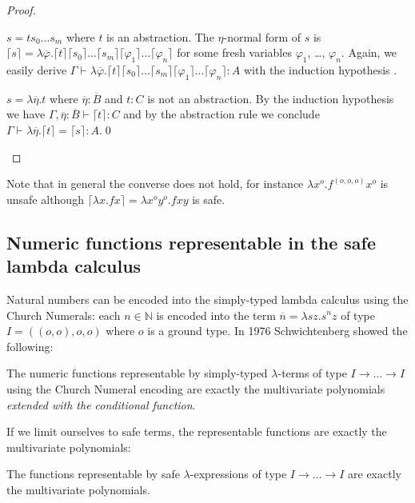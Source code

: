 \documentclass{llncs}
\newcommand{\elnf}[1]{\lceil #1\rceil} %
\newcommand{\encode}[1]{\overline{#1}} \newcommand\dps{\displaystyle}
\newcommand\nat{\mathbb{N}}
\begin{document}
\begin{proof}
\begin{compactitem}
\item $s = t s_0 \ldots s_m$ where $t$ is an abstraction. The $\eta$-normal form of $s$ is
$\elnf{s} = \lambda \overline{\varphi}. \elnf{t} \elnf{s_0} \ldots \elnf{s_m} \elnf{\varphi_1}
  \ldots \elnf{\varphi_n}$ for some fresh variables $\varphi_1$,
  \ldots, $\varphi_n$. Again, we easily derive $\Gamma \vdash
 \lambda \overline{\varphi}. \elnf{t} \elnf{s_0} \ldots \elnf{s_m} \elnf{\varphi_1}
  \ldots \elnf{\varphi_n} : A$ with the induction hypothesis .

\item $s = \lambda \overline{\eta} . t $ where 
$\overline{\eta} : \overline{B}$ and $t:C$ is not an abstraction. By the induction hypothesis we have $\Gamma,
  \overline{\eta} : \overline{B} \vdash \elnf{t} : C$ and by the abstraction rule we conclude
  $\Gamma \vdash \lambda \overline{\eta} . \elnf{t} = \elnf{s} : A$.\qed
\end{compactitem}
\end{proof}

Note that in general the converse does not hold, for instance $\lambda
x^o . f^{(o,o,o)} x^o$ is unsafe although $\elnf{\lambda x . f x} =
\lambda x^o y^o . f x y$ is safe.

\subsection*{Numeric functions representable in the safe lambda calculus}

Natural numbers can be encoded into the simply-typed
lambda calculus using the Church Numerals: each $n\in\nat$ is
encoded into the term $\encode{n} = \lambda s z. s^n z$ of type $I =
((o,o),o,o)$ where $o$ is a ground type. In 1976 Schwichtenberg
\cite{citeulike:622637} showed the following:


\begin{theorem}[Schwichtenberg 1976]
The numeric functions representable by simply-typed $\lambda$-terms of
type $I\rightarrow \ldots \rightarrow I$ using the Church Numeral
encoding are exactly the multivariate polynomials \emph{extended with
the conditional function}.
\end{theorem}

If we limit ourselves to safe terms, the representable functions are
exactly the multivariate polynomials:
\begin{theorem}
\label{thm:polychar}
The functions representable by safe $\lambda$-expressions of type
$I\rightarrow \ldots \rightarrow I$ are exactly the multivariate
polynomials.
\end{theorem}
\end{document}
